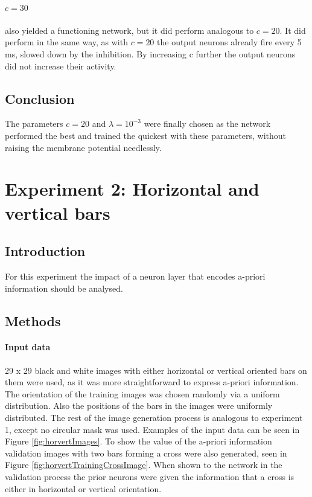 \paragraph{$c = 30$}
also yielded a functioning network, but it did perform analogous to $c = 20$. It did perform in the same way, as with $c = 20$ the output neurons already fire every 5 ms, slowed down by the inhibition. By increasing c further the output neurons did not increase their activity.

\subsection{Conclusion}

The parameters $c = 20$ and $\lambda = 10^{-3} $ were finally chosen as the network performed the best and trained the quickest with these parameters, without raising the membrane potential needlessly.

\section{Experiment 2: Horizontal and vertical bars}
\label{section:horvert}

 \subsection{Introduction}

For this experiment the impact of a neuron layer that encodes a-priori information should be analysed.

\subsection{Methods}

\paragraph{Input data}
29 x 29 black and white images with either horizontal or vertical oriented bars on them were used, as it was more straightforward to express a-priori information. The orientation of the training images was chosen randomly via a uniform distribution. Also the positions of the bars in the images were uniformly distributed. The rest of the image generation process is analogous to experiment 1, except no circular mask was used. Examples of the input data can be seen in Figure \ref{fig:horvertImages}. To show the value of the a-priori information validation images with two bars forming a cross were also generated, seen in Figure \ref{fig:horvertTrainingCrossImage}. When shown to the network in the validation process the prior neurons were given the information that a cross is either in horizontal or vertical orientation.

